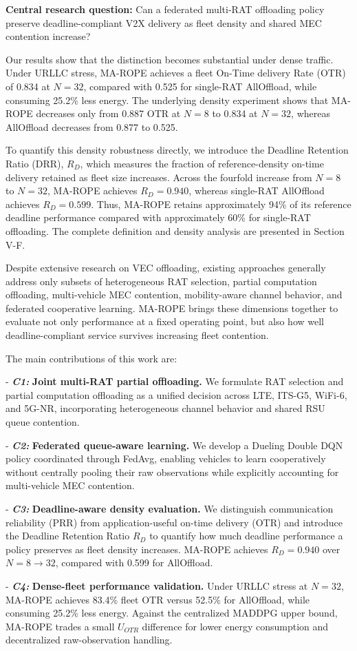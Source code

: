 \textbf{Central research question:} Can a federated multi-RAT offloading policy preserve deadline-compliant V2X delivery as fleet density and shared MEC contention increase?

Our results show that the distinction becomes substantial under dense traffic. Under URLLC stress, MA-ROPE achieves a fleet On-Time delivery Rate (OTR) of 0.834 at $N=32$, compared with 0.525 for single-RAT AllOffload, while consuming 25.2\% less energy. The underlying density experiment shows that MA-ROPE decreases only from 0.887 OTR at $N=8$ to 0.834 at $N=32$, whereas AllOffload decreases from 0.877 to 0.525.

To quantify this density robustness directly, we introduce the Deadline Retention Ratio (DRR), $R_D$, which measures the fraction of reference-density on-time delivery retained as fleet size increases. Across the fourfold increase from $N=8$ to $N=32$, MA-ROPE achieves $R_D=0.940$, whereas single-RAT AllOffload achieves $R_D=0.599$. Thus, MA-ROPE retains approximately 94\% of its reference deadline performance compared with approximately 60\% for single-RAT offloading. The complete definition and density analysis are presented in Section V-F.

Despite extensive research on VEC offloading, existing approaches generally address only subsets of heterogeneous RAT selection, partial computation offloading, multi-vehicle MEC contention, mobility-aware channel behavior, and federated cooperative learning. MA-ROPE brings these dimensions together to evaluate not only performance at a fixed operating point, but also how well deadline-compliant service survives increasing fleet contention.

The main contributions of this work are:

- \textbf{\textit{C1:}} \textbf{Joint multi-RAT partial offloading.} We formulate RAT selection and partial computation offloading as a unified decision across LTE, ITS-G5, WiFi-6, and 5G-NR, incorporating heterogeneous channel behavior and shared RSU queue contention.

- \textbf{\textit{C2:}} \textbf{Federated queue-aware learning.} We develop a Dueling Double DQN policy coordinated through FedAvg, enabling vehicles to learn cooperatively without centrally pooling their raw observations while explicitly accounting for multi-vehicle MEC contention.

- \textbf{\textit{C3:}} \textbf{Deadline-aware density evaluation.} We distinguish communication reliability (PRR) from application-useful on-time delivery (OTR) and introduce the Deadline Retention Ratio $R_D$ to quantify how much deadline performance a policy preserves as fleet density increases. MA-ROPE achieves $R_D=0.940$ over $N=8\rightarrow32$, compared with 0.599 for AllOffload.

- \textbf{\textit{C4:}} \textbf{Dense-fleet performance validation.} Under URLLC stress at $N=32$, MA-ROPE achieves 83.4\% fleet OTR versus 52.5\% for AllOffload, while consuming 25.2\% less energy. Against the centralized MADDPG upper bound, MA-ROPE trades a small $U_{OTR}$ difference for lower energy consumption and decentralized raw-observation handling.
